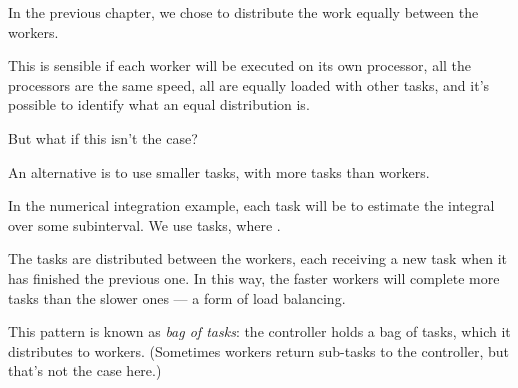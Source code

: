 
\begin{slide}

In the previous chapter, we chose to distribute the work equally between the
workers.

This is sensible if each worker will be executed on its own processor,
all the processors are the same speed, all are equally loaded with other
tasks, and it's possible to identify what an equal distribution is.

But what if this isn't the case?
\end{slide}


\begin{slide}

An alternative is to use smaller tasks, with more tasks than workers.  

In the numerical integration example, each task will be to estimate the
integral over some subinterval.   We use  tasks, where
.

The tasks are distributed between the workers, each receiving a new
task when it has finished the previous one.  In this way, the faster workers
will complete more tasks than the slower ones --- a form of load balancing.

This pattern is known as \emph{bag of tasks}: the controller holds a bag of
tasks, which it distributes to workers.  (Sometimes workers return sub-tasks
to the controller, but that's not the case here.)
\end{slide}







